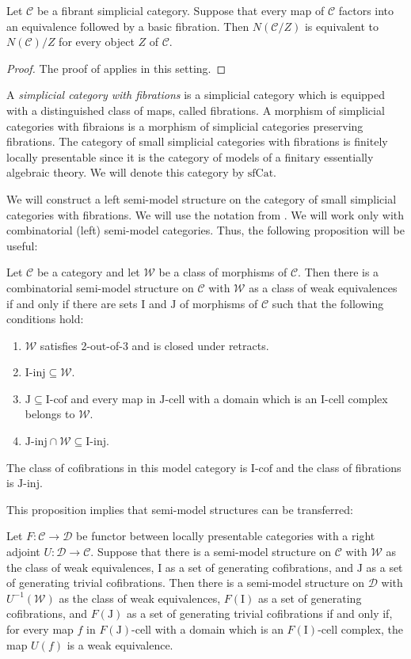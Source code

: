 \documentclass[reqno]{amsart}
\theoremstyle{definition}
\theoremstyle{remark}
\newcommand{\fs}[1]{\mathrm{#1}}
\newcommand{\cat}[1]{\mathcal{#1}}
\newcommand{\C}{\cat{C}}
\newcommand{\D}{\cat{D}}
\newcommand{\sfCat}{\fs{sfCat}}
\newcommand{\I}{\fs{I}}
\newcommand{\J}{\fs{J}}
\newcommand{\we}{\mathcal{W}}
\newcommand{\class}[2]{#1\text{-}\mathrm{#2}}
\newcommand{\Icell}[1][\I]{\class{#1}{cell}}
\newcommand{\Icof}[1][\I]{\class{#1}{cof}}
\newcommand{\Iinj}[1][\I]{\class{#1}{inj}}
\newcommand{\Jcell}[1][]{\Icell[\J#1]}
\newcommand{\Jinj}[1][]{\Iinj[\J#1]}
\numberwithin{figure}{section}
\begin{document}
\begin{prop}
Let $\C$ be a fibrant simplicial category.
Suppose that every map of $\C$ factors into an equivalence followed by a basic fibration.
Then $N(\C/Z)$ is equivalent to $N(\C)/Z$ for every object $Z$ of $\C$.
\end{prop}
\begin{proof}
The proof of \cite[Lemma~6.1.3.13]{lurie-topos} applies in this setting.
\end{proof}

A \emph{simplicial category with fibrations} is a simplicial category which is equipped with a distinguished class of maps, called fibrations.
A morphism of simplicial categories with fibraions is a morphism of simplicial categories preserving fibrations.
The category of small simplicial categories with fibrations is finitely locally presentable since it is the category of models of a finitary essentially algebraic theory.
We will denote this category by $\sfCat$.

We will construct a left semi-model structure on the category of small simplicial categories with fibrations.
We will use the notation from \cite{hovey}.
We will work only with combinatorial (left) semi-model categories.
Thus, the following proposition will be useful:

\begin{prop}
Let $\C$ be a category and let $\we$ be a class of morphisms of $\C$.
Then there is a combinatorial semi-model structure on $\C$ with $\we$ as a class of weak equivalences if and only if there are sets $\I$ and $\J$ of morphisms of $\C$ such that the following conditions hold:
\begin{enumerate}
\item $\we$ satisfies 2-out-of-3 and is closed under retracts.
\item $\Iinj \subseteq \we$.
\item $\J \subseteq \Icof$ and every map in $\Jcell$ with a domain which is an $\Icell$ complex belongs to $\we$.
\item $\Jinj \cap \we \subseteq \Iinj$.
\end{enumerate}
The class of cofibrations in this model category is $\Icof$ and the class of fibrations is $\Jinj$.
\end{prop}

This proposition implies that semi-model structures can be transferred:
\begin{prop}
Let $F : \C \to \D$ be functor between locally presentable categories with a right adjoint $U : \D \to \C$.
Suppose that there is a semi-model structure on $\C$ with $\we$ as the class of weak equivalences, $\I$ as a set of generating cofibrations, and $\J$ as a set of generating trivial cofibrations.
Then there is a semi-model structure on $\D$ with $U^{-1}(\we)$ as the class of weak equivalences, $F(\I)$ as a set of generating cofibrations, and $F(\J)$ as a set of generating trivial cofibrations
if and only if, for every map $f$ in $\Icell[F(\J)]$ with a domain which is an $\Icell[F(\I)]$ complex, the map $U(f)$ is a weak equivalence.
\end{prop}
\end{document}
